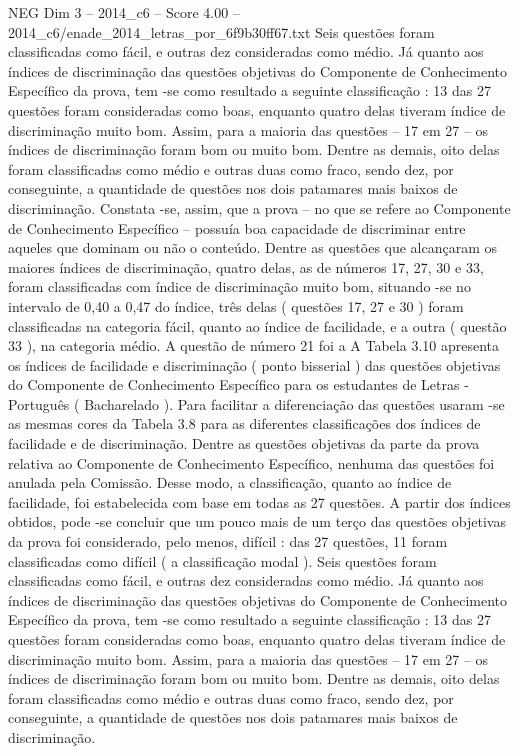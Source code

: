\begin{textsample}{NEG Dim 3 – 2014\_c6 – Score 4.00 – 2014\_c6/enade\_2014\_letras\_por\_6f9b30ff67.txt}
Seis questões foram classificadas como fácil, e outras dez consideradas como médio.
Já quanto aos índices de discriminação das questões objetivas do Componente de Conhecimento Específico da prova, tem -se como resultado a seguinte classificação : 13 das 27 questões foram consideradas como boas, enquanto quatro delas tiveram índice de discriminação muito bom.
Assim, para a maioria das questões – 17 em 27 – os índices de discriminação foram bom ou muito bom.
Dentre as demais, oito delas foram classificadas como médio e outras duas como fraco, sendo dez, por conseguinte, a quantidade de questões nos dois patamares mais baixos de discriminação.
Constata -se, assim, que a prova – no que se refere ao Componente de Conhecimento Específico – possuía boa capacidade de discriminar entre aqueles que dominam ou não o conteúdo.
Dentre as questões que alcançaram os maiores índices de discriminação, quatro delas, as de números 17, 27, 30 e 33, foram classificadas com índice de discriminação muito bom, situando -se no intervalo de 0,40 a 0,47 do índice, três delas ( questões 17, 27 e 30 ) foram classificadas na categoria fácil, quanto ao índice de facilidade, e a outra ( questão 33 ), na categoria médio.
A questão de número 21 foi a A Tabela 3.10 apresenta os índices de facilidade e discriminação ( ponto bisserial ) das questões objetivas do Componente de Conhecimento Específico para os estudantes de Letras - Português ( Bacharelado ).
Para facilitar a diferenciação das questões usaram -se as mesmas cores da Tabela 3.8 para as diferentes classificações dos índices de facilidade e de discriminação.
Dentre as questões objetivas da parte da prova relativa ao Componente de Conhecimento Específico, nenhuma das questões foi anulada pela Comissão.
Desse modo, a classificação, quanto ao índice de facilidade, foi estabelecida com base em todas as 27 questões.
A partir dos índices obtidos, pode -se concluir que um pouco mais de um terço das questões objetivas da prova foi considerado, pelo menos, difícil : das 27 questões, 11 foram classificadas como difícil ( a classificação modal ).
Seis questões foram classificadas como fácil, e outras dez consideradas como médio.
Já quanto aos índices de discriminação das questões objetivas do Componente de Conhecimento Específico da prova, tem -se como resultado a seguinte classificação : 13 das 27 questões foram consideradas como boas, enquanto quatro delas tiveram índice de discriminação muito bom.
Assim, para a maioria das questões – 17 em 27 – os índices de discriminação foram bom ou muito bom.
Dentre as demais, oito delas foram classificadas como médio e outras duas como fraco, sendo dez, por conseguinte, a quantidade de questões nos dois patamares mais baixos de discriminação.

\end{textsample}
